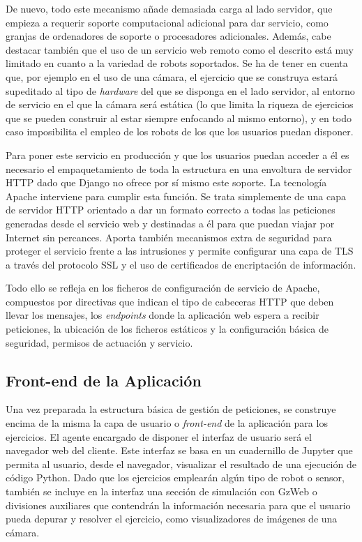 De nuevo, todo este mecanismo añade demasiada carga al lado servidor, que empieza a requerir soporte computacional adicional para dar servicio, como granjas de ordenadores de soporte o procesadores adicionales. Además, cabe destacar también que el uso de un servicio web remoto como el descrito está muy limitado en cuanto a la variedad de robots soportados. Se ha de tener en cuenta que, por ejemplo en el uso de una cámara, el ejercicio que se construya estará supeditado al tipo de \textit{hardware} del que se disponga en el lado servidor, al entorno de servicio en el que la cámara será estática (lo que limita la riqueza de ejercicios que se pueden construir al estar siempre enfocando al mismo entorno), y en todo caso imposibilita el empleo de los robots de los que los usuarios puedan disponer.

Para poner este servicio en producción y que los usuarios puedan acceder a él es necesario el empaquetamiento de toda la estructura en una envoltura de servidor HTTP dado que Django no ofrece por sí mismo este soporte. La tecnología Apache interviene para cumplir esta función. Se trata simplemente de una capa de servidor HTTP orientado a dar un formato correcto a todas las peticiones generadas desde el servicio web y destinadas a él para que puedan viajar por Internet sin percances. Aporta también mecanismos extra de seguridad para proteger el servicio frente a las intrusiones y permite configurar una capa de TLS a través del protocolo SSL y el uso de certificados de encriptación de información.

Todo ello se refleja en los ficheros de configuración de servicio de Apache, compuestos por directivas que indican el tipo de cabeceras HTTP que deben llevar los mensajes, los \textit{endpoints} donde la aplicación web espera a recibir peticiones, la ubicación de los ficheros estáticos y la configuración básica de seguridad, permisos de actuación y servicio.

\subsection{Front-end de la Aplicación}

Una vez preparada la estructura básica de gestión de peticiones, se construye encima de la misma la capa de usuario o \textit{front-end} de la aplicación para los ejercicios. El agente encargado de disponer el interfaz de usuario será el navegador web del cliente. Este interfaz se basa en un cuadernillo de Jupyter que permita al usuario, desde el navegador, visualizar el resultado de una ejecución de código Python. Dado que los ejercicios emplearán algún tipo de robot o sensor, también se incluye en la interfaz una sección de simulación con GzWeb o divisiones auxiliares que contendrán la información necesaria para que el usuario pueda depurar y resolver el ejercicio, como visualizadores de imágenes de una cámara.

